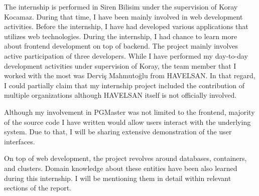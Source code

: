 The internship is performed in Siren Bilisim under the supervision of Koray 
Kocamaz. During that time, I have been mainly involved in web development 
activities. Before the internship, I have had developed various applications 
that utilizes web technologies. During the internship, I had chance to learn 
more about frontend development on top of backend. The project mainly involves 
active participation of three developers. While I have performed my day-to-day 
development activities under supervision of Koray, the team member that I 
worked with the most was Derviş Mahmutoğlu from HAVELSAN. In that regard, I 
could partially claim that my internship project included the contribution of 
multiple organizations although HAVELSAN itself is not officially involved.
\par
Although my involvement in PGMaster was not limited to the frontend, majority 
of the source code I have written would allow users interact with the 
underlying system. Due to that, I will be sharing extensive demonstration of 
the user interfaces.
\par
On top of web development, the project revolves around databases, containers, 
and clusters. Domain knowledge about these entities have been also learned 
during this internship. I will be mentioning them in detail within relevant 
sections of the report.